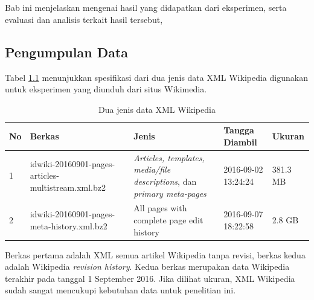 \chapter{\babLima}
Bab ini menjelaskan mengenai hasil yang didapatkan dari eksperimen, serta evaluasi dan analisis terkait hasil tersebut,
\section{Pengumpulan Data}
Tabel \ref{table:dataXML} menunjukkan spesifikasi dari dua jenis data XML Wikipedia digunakan untuk eksperimen yang diunduh dari situs Wikimedia.

\begin{table}
	\centering
	\caption{Dua jenis data XML Wikipedia}
	\label{table:dataXML}
		\begin{tabular}{|p{0.7cm}|p{4cm}|p{4cm}|p{2cm}|p{1.5cm}|}
			\hline
			No & Berkas & Jenis & Tangga Diambil & Ukuran \\ 
			\hline
			1    & 
			idwiki-20160901-pages-articles-multistream.xml.bz2   & \textit{Articles, templates, media/file descriptions}, dan \textit{primary meta-pages}  & 2016-09-02 13:24:24  & 
			381.3 MB  \\ \hline
			2    & 
			idwiki-20160901-pages-meta-history.xml.bz2     & 
			All pages with complete page edit history  & 
			2016-09-07 18:22:58  & 
			2.8 GB    \\ \hline
		\end{tabular}
\end{table}
\noindent Berkas pertama adalah XML semua artikel Wikipedia tanpa revisi, berkas kedua adalah Wikipedia \textit{revision history}. Kedua berkas merupakan data Wikipedia terakhir pada tanggal 1 September 2016. Jika dilihat ukuran, XML Wikipedia sudah sangat mencukupi kebutuhan data untuk penelitian ini.

